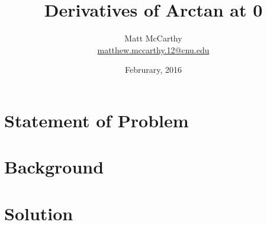 \documentclass[notitlepage]{simple}
\author{Matt McCarthy\\\href{mailto:matthew.mccarthy.12@cnu.edu}{matthew.mccarthy.12@cnu.edu}}
\title{Derivatives of Arctan at 0}
\date{Februrary, 2016}
\begin{document}
\maketitle

\section{Statement of Problem}

\section{Background}

\section{Solution}
\end{document}
